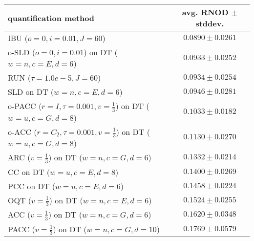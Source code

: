\begin{tabular}{lc}
  \toprule
  quantification method & avg. RNOD $\pm$ stddev. \\
  \midrule
  IBU ($o=0, i=0.01, J=60$) & $\mathbf{0.0890 \pm 0.0261}$ \\
  o-SLD ($o=0, i=0.01$) on DT ($w=n, c=E, d=6$) & $0.0933 \pm 0.0252$ \\
  RUN ($\tau=1.0e-5, J=60$) & $0.0934 \pm 0.0254$ \\
  SLD on DT ($w=n, c=E, d=6$) & $0.0946 \pm 0.0281$ \\
  o-PACC ($r=I, \tau=0.001, v=\frac{1}{3}$) on DT ($w=u, c=G, d=8$) & $0.1033 \pm 0.0182$ \\
  o-ACC ($r=C_2, \tau=0.001, v=\frac{1}{3}$) on DT ($w=u, c=G, d=8$) & $0.1130 \pm 0.0270$ \\
  ARC ($v=\frac{1}{3}$) on DT ($w=n, c=G, d=6$) & $0.1332 \pm 0.0214$ \\
  CC on DT ($w=u, c=E, d=8$) & $0.1400 \pm 0.0269$ \\
  PCC on DT ($w=u, c=E, d=6$) & $0.1458 \pm 0.0224$ \\
  OQT ($v=\frac{1}{3}$) on DT ($w=n, c=E, d=6$) & $0.1524 \pm 0.0255$ \\
  ACC ($v=\frac{1}{3}$) on DT ($w=n, c=G, d=6$) & $0.1620 \pm 0.0348$ \\
  PACC ($v=\frac{1}{3}$) on DT ($w=n, c=G, d=10$) & $0.1769 \pm 0.0579$ \\
  \bottomrule
\end{tabular}
